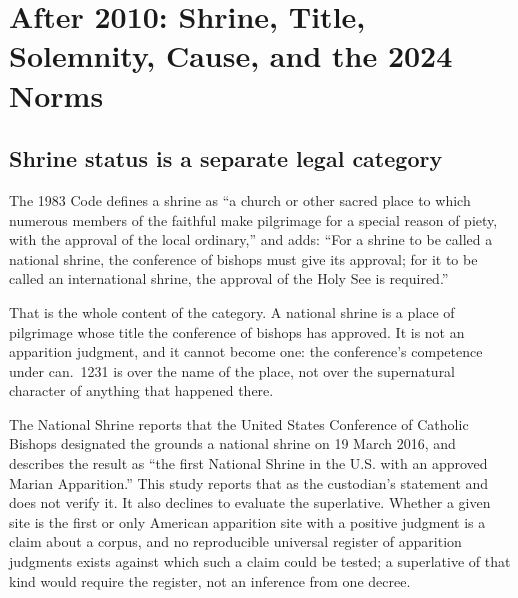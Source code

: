 \section{After 2010: Shrine, Title, Solemnity, Cause, and the 2024 Norms}

\subsection{Shrine status is a separate legal category}

The 1983 Code defines a shrine as ``a church or other sacred place to
which numerous members of the faithful make pilgrimage for a special
reason of piety, with the approval of the local ordinary,'' and adds:
``For a shrine to be called a national shrine, the conference of
bishops must give its approval; for it to be called an international
shrine, the approval of the Holy See is required.''

That is the whole content of the category. A national shrine is a place
of pilgrimage whose title the conference of bishops has approved. It is
not an apparition judgment, and it cannot become one: the conference's
competence under can.~1231 is over the name of the place, not over the
supernatural character of anything that happened there.

The National Shrine reports that the United States Conference of
Catholic Bishops designated the grounds a national shrine on 19 March
2016, and describes the result as ``the first National Shrine in the
U.S. with an approved Marian Apparition.'' This study reports that as the custodian's
statement and does not verify it. It also declines to evaluate the
superlative. Whether a given site is the first or only American
apparition site with a positive judgment is a claim about a corpus, and
no reproducible universal register of apparition judgments exists
against which such a claim could be tested; a superlative of that kind
would require the register, not an inference from one decree.

